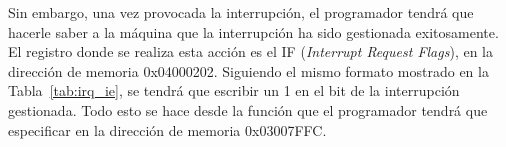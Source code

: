 Sin embargo, una vez provocada la interrupción, el programador tendrá que hacerle saber a la máquina que la interrupción ha sido gestionada exitosamente. El registro donde se realiza esta acción es el IF (\textit{Interrupt Request Flags}), en la dirección de memoria 0x04000202. Siguiendo el mismo formato mostrado en la Tabla~\ref{tab:irq_ie}, se tendrá que escribir un 1 en el bit de la interrupción gestionada. Todo esto se hace desde la función que el programador tendrá que especificar en la dirección de memoria 0x03007FFC.
